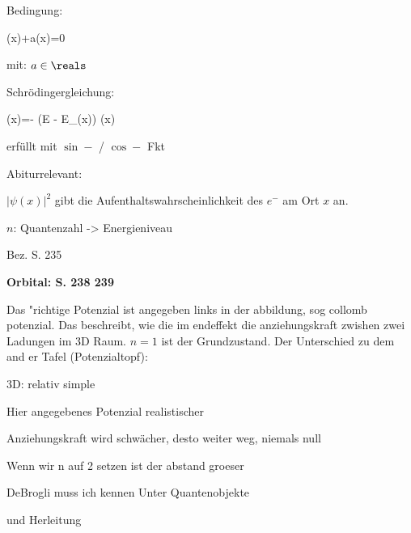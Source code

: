 Bedingung: 

\startplaceformula[2025:01:29:phi]
\startformula
\psi(x)+a\cdot \ddot{\psi}(x)=0
\stopformula
\stopplaceformula

mit: $a \in \reals$

Schrödingergleichung:

\startplaceformula[2025:01:29:schroedinger]
\startformula
\ddot{\psi}(x)=- \cdot (E - E_{}(x)) \cdot \psi(x)
\stopformula
\stopplaceformula

erfüllt mit $\sin-$ / $\cos-$ Fkt 

\startframedwarning
Abiturrelevant:
\stopframedwarning

$|\psi(x)|^2$ gibt die Aufenthaltswahrscheinlichkeit des $e^-$ am Ort $x$ an.

\startitemize[packed]
\item $n$: Quantenzahl -> Energieniveau
\item Bez. S. 235
\stopitemize

\startframedtipp
{\bf Orbital: S. 238 239}

Das "richtige Potenzial ist angegeben links in der abbildung, sog collomb
potenzial. Das beschreibt, wie die im endeffekt die anziehungskraft zwishen
zwei Ladungen im 3D Raum.  $n=1$ ist der Grundzustand. Der Unterschied zu dem and er Tafel (Potenzialtopf):

\startitemize[packed,m]
\item 3D: relativ simple
\item Hier angegebenes Potenzial realistischer
\item Anziehungskraft wird schwächer, desto weiter weg, niemals null
\item 
\stopitemize

Wenn wir n auf 2 setzen ist der abstand groeser
\stopframedtipp



\startframedtipp
DeBrogli muss ich kennen
Unter Quantenobjekte

und Herleitung
\stopframedtipp
